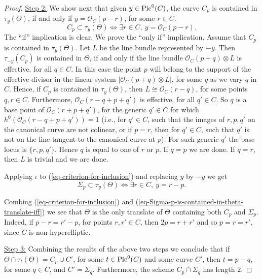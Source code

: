 \documentclass[12pt]{amsart}
\numberwithin{equation}{subsection}
\theoremstyle{plain}
\theoremstyle{definition}
\newcommand{\StructureSheaf}[1]{{\mathcal O}_{#1}}
\newcommand{\Pic}{{\rm Pic}}
\begin{document}
\begin{proof}
\underline{Step 2:}
We show next that given $y\in\Pic^0(C)$, the curve $C_p$ is contained in $\tau_y(\Theta)$, if and only if $y=\StructureSheaf{C}(p-r)$, for some $r\in C$. 
\begin{equation}
\label{eq-criterion-for-inclusion}
C_p\subset \tau_y(\Theta) \Leftrightarrow \exists r\in C, \ y=\StructureSheaf{C}(p-r).
\end{equation}
The ``if'' implication is clear. We prove the ``only if'' implication. Assume that $C_p$ is contained in $\tau_y(\Theta)$.
Let $L$ be the line bundle represented by $-y$. Then $\tau_{-y}(C_p)$ is contained in $\Theta$, if and only if the line bundle $\StructureSheaf{C}(p+q)\otimes L$ is effective, for all $q\in C$.  In this case the point $p$ will belong to
the support of the effective divisor in the linear system $|\StructureSheaf{C}(p+q)\otimes L|$, for some $q$ as we vary $q$ in $C$.
Hence, if $C_p$ is contained in $\tau_y(\Theta)$, then $L\cong \StructureSheaf{C}(r-q)$, for some points $q, r\in C$.
Furthermore, $\StructureSheaf{C}(r-q+p+q')$ is effective, for all $q'\in C$. So $q$ is a base point of
$\StructureSheaf{C}(r+p+q')$, for the generic $q'\in C$ for which $h^0(\StructureSheaf{C}(r-q+p+q'))=1$ (i.e., for $q'\in C$, such that the images of $r, p, q'$ on the canonical curve are not colinear, or if $p=r$, then for $q'\in C$, such that $q'$ is not on the line tangent to the canonical curve at $p$). 
For such generic $q'$ the base locus is $\{r, p, q'\}$. 
Hence $q$ is equal to one of $r$ or $p$. If $q=p$ we are done. If $q=r$, then $L$ is trivial and we are done. 

Applying $\iota$ to (\ref{eq-criterion-for-inclusion}) and replacing $y$ by $-y$ we get
\begin{equation}
\label{eq-Sigma-p-is-contained-in-theta-translate-iff}
\Sigma_p\subset \tau_{y}(\Theta) \Leftrightarrow \exists r\in C, \ y=r-p.
\end{equation}

Combing (\ref{eq-criterion-for-inclusion}) and (\ref{eq-Sigma-p-is-contained-in-theta-translate-iff}) we see that $\Theta$ is the only translate of $\Theta$ containing both $C_p$ and $\Sigma_p$. Indeed, if $p-r=r'-p$, for points $r,r'\in C$, then $2p=r+r'$ and so $p=r=r'$, since $C$ is non-hyperelliptic.

\underline{Step 3:}
Combining the results of the above two steps we conclude that if $\Theta\cap\tau_t(\Theta)=C_p\cup C'$, for some $t\in \Pic^0(C)$ and some curve $C'$, then $t=p-q$, for some $q\in C$, and $C'=\Sigma_q$. Furthermore, the scheme $C_p\cap\Sigma_q$
has length $2$. 


\end{proof}
\end{document}
